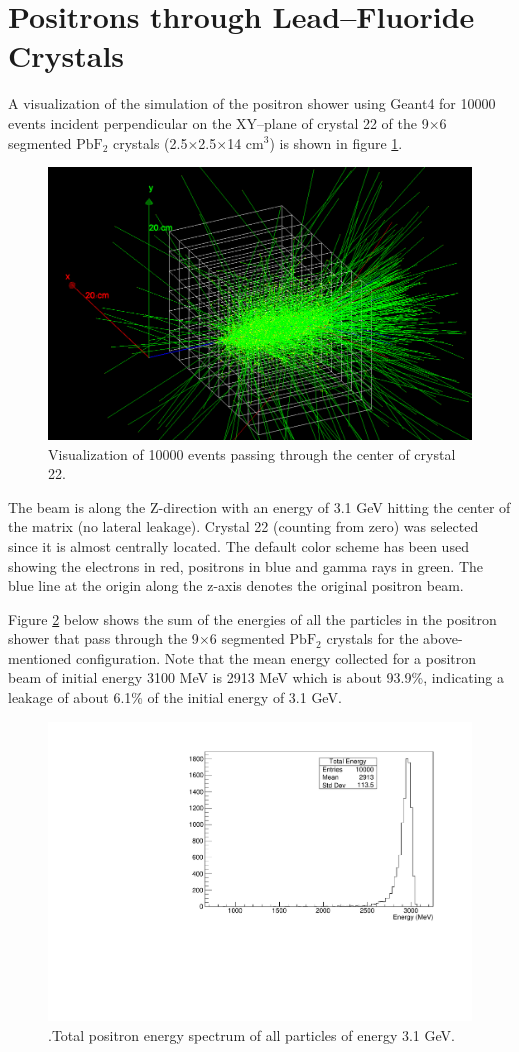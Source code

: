 \documentclass[article,accept,moreauthors,pdftex,10pt,a4paper]{../MDPI_template/Definitions/mdpi}
\begin{document}
\section{Positrons through Lead--Fluoride Crystals}
A visualization of the simulation of the positron shower using Geant4 for 10000 events 
incident perpendicular on the XY--plane of crystal 22 of the 9$\times$6 segmented $\mathrm{PbF_2}$
 crystals (2.5$\times$2.5$\times$14 cm$^3$) is shown in figure \ref{fig1}.
\begin{figure}[H]
\centering
\includegraphics[width=8 cm]{visual.png}
\caption{\label{fig1} Visualization of 10000 events passing through the center of crystal 22. }
\end{figure}
The beam is along the Z-direction with an energy of 3.1 GeV hitting the center of the matrix 
(no lateral leakage). Crystal 22 (counting from zero) was selected since it is almost centrally located. 
 The default color scheme has been used showing the electrons in red, positrons in blue 
and gamma rays in green. The blue line at the origin along the z-axis denotes the original positron beam. 

Figure \ref{fig2} below shows the sum of the energies of all the particles in the positron 
shower that pass through the 9$\times$6 segmented $\mathrm{PbF_2}$ crystals for the above-mentioned configuration. 
Note that the mean energy collected for a positron beam of initial energy 3100 MeV is 2913 MeV which is about 93.9\%, 
indicating a leakage of about 6.1\% of the initial energy of 3.1 GeV.
\begin{figure}[H]
\centering
\includegraphics[width=10 cm]{total_energy.pdf}
\caption{\label{fig2}.Total positron energy spectrum of all particles of energy 3.1 GeV.}
\end{figure} 
\end{document}
